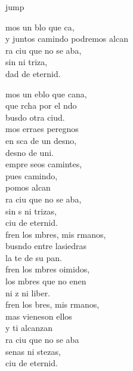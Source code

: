 \begin{cancion}jump\\
	\begin{chorus}%
		mos un blo que ca,\\
		y juntos camindo podremos alcan \\
		ra ciu que no se aba,\\
		sin  ni triza,\\
		dad de eternid.\jump\\
	\end{chorus}%
	mos un eblo que cana,\\
	que rcha por el ndo\\
	busdo otra ciud.\\
	mos erraes peregnos\\
	en sca de un desno,\\
	desno de uni.\\
	empre seos camintes,\\
	pues  camindo,\\
	pomos alcan \\
	ra ciu que no se aba,\\
	sin s ni trizas,\\
	ciu de eternid.\\
	\jump
	fren los mbres, mis rmanos,\\
	busndo entre lasiedras\\
	la te de su pan. \\
	fren los mbres oimidos,\\
	los mbres que no enen\\
	ni z ni liber.\\
	fren los bres, mis rmanos,\\
	mas vieneson ellos\\
	y ti alcanzan\\
	ra ciu que no se aba\\
	senas ni stezas,\\
	ciu de eternid.\\
\end{cancion}%
